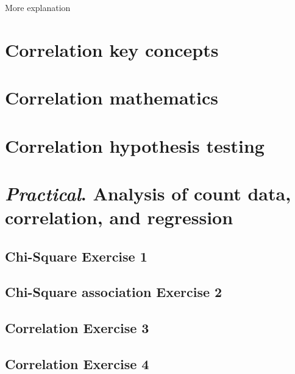 \documentclass[
]{scrbook}
\begin{document}
More explanation

\hypertarget{correlation-key-concepts}{%
\chapter{Correlation key concepts}\label{correlation-key-concepts}}

\hypertarget{correlation-mathematics}{%
\chapter{Correlation mathematics}\label{correlation-mathematics}}

\hypertarget{correlation-hypothesis-testing}{%
\chapter{Correlation hypothesis testing}\label{correlation-hypothesis-testing}}

\hypertarget{practical.-analysis-of-count-data-correlation-and-regression}{%
\chapter{\texorpdfstring{\emph{Practical}. Analysis of count data, correlation, and regression}{Practical. Analysis of count data, correlation, and regression}}\label{practical.-analysis-of-count-data-correlation-and-regression}}

\hypertarget{chi-square-exercise-1}{%
\section{Chi-Square Exercise 1}\label{chi-square-exercise-1}}

\hypertarget{chi-square-association-exercise-2}{%
\section{Chi-Square association Exercise 2}\label{chi-square-association-exercise-2}}

\hypertarget{correlation-exercise-3}{%
\section{Correlation Exercise 3}\label{correlation-exercise-3}}

\hypertarget{correlation-exercise-4}{%
\section{Correlation Exercise 4}\label{correlation-exercise-4}}
\end{document}
